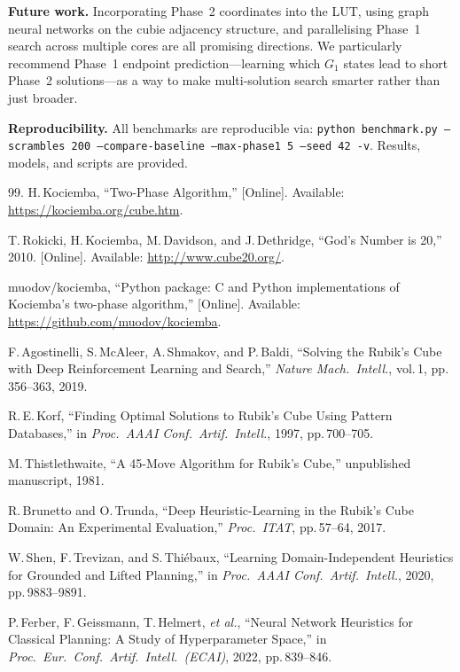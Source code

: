 \documentclass[graybox]{svmult}
\begin{document}
\textbf{Future work.} Incorporating Phase~2 coordinates into the LUT, using graph neural networks on the cubie adjacency structure, and parallelising Phase~1 search across multiple cores are all promising directions. We particularly recommend Phase~1 endpoint prediction---learning which $G_1$ states lead to short Phase~2 solutions---as a way to make multi-solution search smarter rather than just broader.

\textbf{Reproducibility.} All benchmarks are reproducible via: \texttt{python benchmark.py --scrambles 200 --compare-baseline --max-phase1 5 --seed 42 -v}. Results, models, and scripts are provided.

\begin{thebibliography}{99.}
H.\,Kociemba, ``Two-Phase Algorithm,'' [Online]. Available:
\url{https://kociemba.org/cube.htm}.

T.\,Rokicki, H.\,Kociemba, M.\,Davidson, and J.\,Dethridge,
``God's Number is 20,'' 2010. [Online]. Available:
\url{http://www.cube20.org/}.

muodov/kociemba, ``Python package: C and Python implementations of
Kociemba's two-phase algorithm,'' [Online]. Available:
\url{https://github.com/muodov/kociemba}.

F.\,Agostinelli, S.\,McAleer, A.\,Shmakov, and P.\,Baldi,
``Solving the {R}ubik's {C}ube with Deep Reinforcement Learning and
Search,'' \textit{Nature Mach.\ Intell.}, vol.\,1, pp.\,356--363, 2019.

R.\,E.\,Korf, ``Finding Optimal Solutions to {R}ubik's {C}ube Using
Pattern Databases,'' in \textit{Proc.\ AAAI Conf.\ Artif.\ Intell.},
1997, pp.\,700--705.

M.\,Thistlethwaite, ``A 45-Move Algorithm for {R}ubik's {C}ube,''
unpublished manuscript, 1981.

R.\,Brunetto and O.\,Trunda, ``Deep Heuristic-Learning in the
{R}ubik's {C}ube Domain: An Experimental Evaluation,''
\textit{Proc.\ ITAT}, pp.\,57--64, 2017.

W.\,Shen, F.\,Trevizan, and S.\,Thi\'ebaux, ``Learning
Domain-Independent Heuristics for Grounded and Lifted Planning,''
in \textit{Proc.\ AAAI Conf.\ Artif.\ Intell.}, 2020,
pp.\,9883--9891.

P.\,Ferber, F.\,Geissmann, T.\,Helmert, \textit{et al.},
``Neural Network Heuristics for Classical Planning: A Study of
Hyperparameter Space,'' in \textit{Proc.\ Eur.\ Conf.\ Artif.\
Intell.\ (ECAI)}, 2022, pp.\,839--846.


\end{thebibliography}
\end{document}
